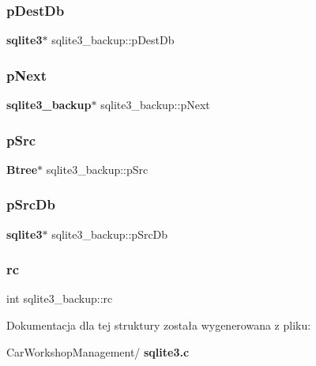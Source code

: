 \subsubsection{pDestDb}
{\footnotesize\ttfamily \textbf{ sqlite3}$\ast$ sqlite3\+\_\+backup\+::p\+Dest\+Db}

\mbox{\label{structsqlite3__backup_a3a87332e045fe4a477fe262409c6011a}} 
\subsubsection{pNext}
{\footnotesize\ttfamily \textbf{ sqlite3\+\_\+backup}$\ast$ sqlite3\+\_\+backup\+::p\+Next}

\mbox{\label{structsqlite3__backup_aa48f873d1de446638ff71fdae606e672}} 
\subsubsection{pSrc}
{\footnotesize\ttfamily \textbf{ Btree}$\ast$ sqlite3\+\_\+backup\+::p\+Src}

\mbox{\label{structsqlite3__backup_a0bcc0528bb3f5ec52eb40c3e7a4f7adc}} 
\subsubsection{pSrcDb}
{\footnotesize\ttfamily \textbf{ sqlite3}$\ast$ sqlite3\+\_\+backup\+::p\+Src\+Db}

\mbox{\label{structsqlite3__backup_aab860dbed6181702b4c6b80d43cde411}} 
\subsubsection{rc}
{\footnotesize\ttfamily int sqlite3\+\_\+backup\+::rc}



Dokumentacja dla tej struktury została wygenerowana z pliku\+:\begin{DoxyCompactItemize}
\item 
Car\+Workshop\+Management/\textbf{ sqlite3.\+c}\end{DoxyCompactItemize}
